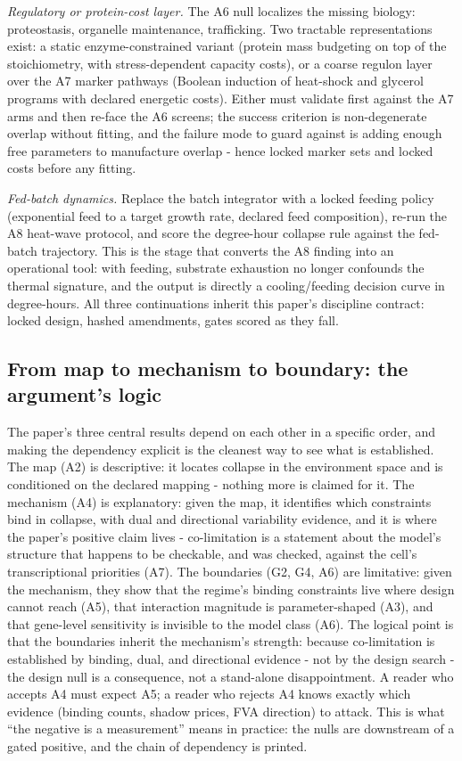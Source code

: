 \documentclass[12pt]{article}
\begin{document}
\emph{Regulatory or protein-cost layer.} The A6 null localizes the
missing biology: proteostasis, organelle maintenance, trafficking.
Two tractable representations exist: a static enzyme-constrained
variant (protein mass budgeting on top of the stoichiometry, with
stress-dependent capacity costs), or a coarse regulon layer over the
A7 marker pathways (Boolean induction of heat-shock and glycerol
programs with declared energetic costs). Either must validate first
against the A7 arms and then re-face the A6 screens; the success
criterion is non-degenerate overlap without fitting, and the failure
mode to guard against is adding enough free parameters to
manufacture overlap - hence locked marker sets and locked costs
before any fitting.

\emph{Fed-batch dynamics.} Replace the batch integrator with a locked
feeding policy (exponential feed to a target growth rate, declared
feed composition), re-run the A8 heat-wave protocol, and score the
degree-hour collapse rule against the fed-batch trajectory. This is
the stage that converts the A8 finding into an operational tool: with
feeding, substrate exhaustion no longer confounds the thermal
signature, and the output is directly a cooling/feeding decision
curve in degree-hours. All three continuations inherit this paper's
discipline contract: locked design, hashed amendments, gates scored
as they fall.


\subsection{From map to mechanism to boundary: the argument's logic}

The paper's three central results depend on each other in a specific
order, and making the dependency explicit is the cleanest way to see
what is established. The map (A2) is descriptive: it locates collapse
in the environment space and is conditioned on the declared mapping -
nothing more is claimed for it. The mechanism (A4) is explanatory:
given the map, it identifies which constraints bind in collapse, with
dual and directional variability evidence, and it is where the
paper's positive claim lives - co-limitation is a statement about
the model's structure that happens to be checkable, and was checked,
against the cell's transcriptional priorities (A7). The boundaries
(G2, G4, A6) are limitative: given the mechanism, they show that the
regime's binding constraints live where design cannot reach (A5),
that interaction magnitude is parameter-shaped (A3), and that
gene-level sensitivity is invisible to the model class (A6). The
logical point is that the boundaries inherit the mechanism's
strength: because co-limitation is established by binding, dual, and
directional evidence - not by the design search - the design null is
a consequence, not a stand-alone disappointment. A reader who accepts
A4 must expect A5; a reader who rejects A4 knows exactly which
evidence (binding counts, shadow prices, FVA direction) to attack.
This is what ``the negative is a measurement'' means in practice:
the nulls are downstream of a gated positive, and the chain of
dependency is printed.
\end{document}
